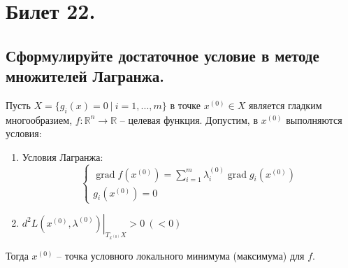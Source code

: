 \section{Билет 22.}

\subsection{Сформулируйте достаточное условие в методе множителей Лагранжа.}
\begin{theorem}
    Пусть $X = \{
        g_i(x) = 0
        \> | \>
        i = 1, ..., m
    \}$ в точке $x^{(0)} \in X$ является гладким многообразием,
    $f : \mathbb{R}^n \to \mathbb{R}$ -- целевая функция. Допустим, в $x^{(0)}$ выполняются условия:
    \begin{enumerate}
        \item Условия Лагранжа:
        \[
            \begin{cases}
                \operatorname{grad} f(x^{(0)}) = \sum_{i = 1}^m \lambda_i^{(0)} \operatorname{grad} g_i(x^{(0)}) \\
                g_i(x^{(0)}) = 0
            \end{cases}
        \]
        \item $d^2 \left. L(x^{(0)}, \lambda^{(0)}) \right|_{T_{x^{(0)}} X} > 0 \> (< 0)$
    \end{enumerate}
    Тогда $x^{(0)}$ -- точка условного локального минимума (максимума) для $f$.
\end{theorem}

